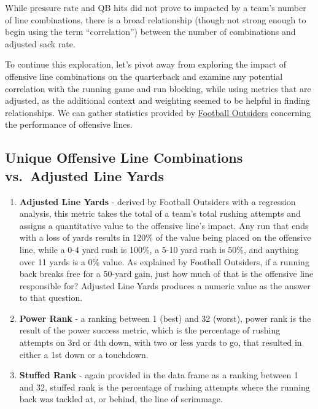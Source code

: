 \documentclass[
  letterpaper,
]{krantz}
\providecommand{\tightlist}{%
  \setlength{\itemsep}{0pt}\setlength{\parskip}{0pt}}\usepackage{longtable,booktabs,array}
\begin{document}
While pressure rate and QB hits did not prove to impacted by a team's
number of line combinations, there is a broad relationship (though not
strong enough to begin using the term ``correlation'') between the
number of combinations and adjusted sack rate.

To continue this exploration, let's pivot away from exploring the impact
of offensive line combinations on the quarterback and examine any
potential correlation with the running game and run blocking, while
using metrics that are adjusted, as the additional context and weighting
seemed to be helpful in finding relationships. We can gather statistics
provided by \href{https://www.footballoutsiders.com/}{Football
Outsiders} concerning the performance of offensive lines.

\hypertarget{unique-offensive-line-combinations-vs.-adjusted-line-yards}{%
\subsection{Unique Offensive Line Combinations vs.~Adjusted Line
Yards}\label{unique-offensive-line-combinations-vs.-adjusted-line-yards}}

\begin{enumerate}
\def\labelenumi{\arabic{enumi}.}
\tightlist
\item
  \textbf{Adjusted Line Yards} - derived by Football Outsiders with a
  regression analysis, this metric takes the total of a team's total
  rushing attempts and assigns a quantitative value to the offensive
  line's impact. Any run that ends with a loss of yards results in 120\%
  of the value being placed on the offensive line, while a 0-4 yard rush
  is 100\%, a 5-10 yard rush is 50\%, and anything over 11 yards is a
  0\% value. As explained by Football Outsiders, if a running back
  breaks free for a 50-yard gain, just how much of that is the offensive
  line responsible for? Adjusted Line Yards produces a numeric value as
  the answer to that question.
\item
  \textbf{Power Rank} - a ranking between 1 (best) and 32 (worst), power
  rank is the result of the power success metric, which is the
  percentage of rushing attempts on 3rd or 4th down, with two or less
  yards to go, that resulted in either a 1st down or a touchdown.
\item
  \textbf{Stuffed Rank} - again provided in the data frame as a ranking
  between 1 and 32, stuffed rank is the percentage of rushing attempts
  where the running back was tackled at, or behind, the line of
  scrimmage.
\end{enumerate}
\end{document}
